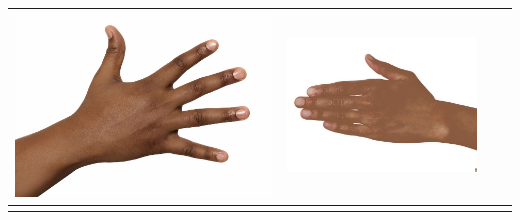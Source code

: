 \begin{longtable}{|N||c|c|c|}
\begin{minipage}{.29\textwidth}
    \includegraphics[width=\textwidth,height=\textheight,keepaspectratio]{../inputs/hand_dark.jpg}
  \end{minipage} & 
  \begin{minipage}{.29\textwidth}
    \includegraphics[width=\textwidth,height=\textheight,keepaspectratio]{../rc_test/outputs/20170517_proportional_corrected_test_alpha10/hand_brown_to_hand_dark.jpg}
  \end{minipage} \\
\hline  \label{row:prop_correct_test_a10_hand_brown_to_hand_light} &
  \begin{minipage}{.29\textwidth}

\end{minipage}
\end{longtable}
